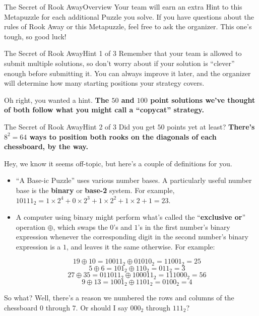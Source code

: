 \begin{metapuzzle}{The Secret of Rook Away}{Overview}
  Your team will earn an extra Hint to this Metapuzzle for each additional
  Puzzle you solve. If you have questions about the rules of Rook Away or this
  Metapuzzle, feel free to ask the organizer. This one's tough, so good luck!

\end{metapuzzle}



\begin{metapuzzle}{The Secret of Rook Away}{Hint 1 of 3}
  Remember that your team
  is allowed to submit multiple solutions, so don't worry about if your
  solution is ``clever'' enough before submitting it. You can always
  improve it later, and the organizer will determine how many starting
  positions your strategy covers.

  \vspace{3em}

  Oh right, you wanted a hint.
  \textbf{The \(50\) and \(100\) point solutions we've thought of
  both follow what you might call a ``copycat'' strategy.}

\end{metapuzzle}



\begin{metapuzzle}{The Secret of Rook Away}{Hint 2 of 3}
  Did you get \(50\) points yet at least? \textbf{There's \(8^2=64\) ways to
  position both rooks on the diagonals of each chessboard, by the way.}

  \noindent
  Hey, we know it seems off-topic, but here's a couple of definitions for you.

  \begin{itemize}
    \item ``A Base-ic Puzzle'' uses various number bases. A particularly useful
          number base is the \textbf{binary} or \textbf{base-2} system. For
          example, $10111_2=1\times 2^4+0\times 2^3+1\times 2^2+1\times 2+1=23$.

    \item A computer using binary might perform what's called the
          ``\textbf{exclusive or}'' operation $\oplus$, which swaps the
          $0$'s and $1$'s in the first number's binary expression whenever the
          corresponding digit in the second number's binary expression is a $1$,
          and leaves it the same otherwise.
          For example:

      \[19 \oplus 10 = 10011_2 \oplus 01010_2 = 11001_2 = 25\]
      \[5 \oplus 6 = 101_2 \oplus 110_2 = 011_2 = 3\]
      \[27 \oplus 35 = 011011_2 \oplus 100011_2 = 111000_2 = 56\]
      \[9 \oplus 13 = 1001_2 \oplus 1101_2 = 0100_2 = 4\]
  \end{itemize}

  So what? Well, there's a reason we numbered the rows and columns of the
  chessboard $0$ through $7$. Or should I say $000_2$ through $111_2$?

\end{metapuzzle}



